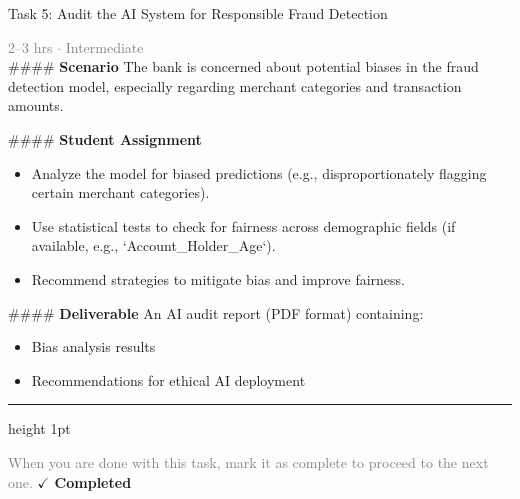 \documentclass[10pt,a4paper]{article}
\begin{document}
\begin{taskbox}{Task 5: Audit the AI System for Responsible Fraud Detection}

    {\small \textcolor{gray}{2--3 hrs $\cdot$ Intermediate}}\\[12pt]

    \#\#\#\# \textbf{Scenario}  
The bank is concerned about potential biases in the fraud detection model, especially regarding merchant categories and transaction amounts.  

\#\#\#\# \textbf{Student Assignment}  
\begin{itemize}
    \item Analyze the model for biased predictions (e.g., disproportionately flagging certain merchant categories).  
    \item Use statistical tests to check for fairness across demographic fields (if available, e.g., `Account\_Holder\_Age`).  
    \item Recommend strategies to mitigate bias and improve fairness.  
\end{itemize}

\#\#\#\# \textbf{Deliverable}  
An AI audit report (PDF format) containing:  
\begin{itemize}
    \item Bias analysis results  
    \item Recommendations for ethical AI deployment\par
\end{itemize}

    \vspace{16pt}

    \textcolor{cardBorder}{\hrule height 1pt}\vspace{8pt}

    \small \textcolor{gray}{When you are done with this task, mark it as complete to proceed to the next one.} \hfill \textbf{\textcolor{brandDark}{$\checkmark$ Completed}}

\end{taskbox}
\end{document}
